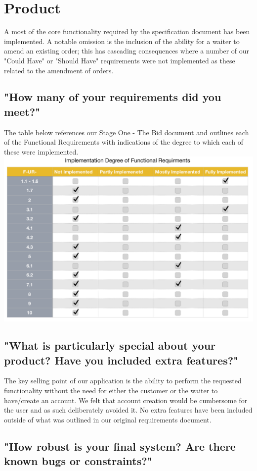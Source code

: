 \documentclass[11pt, oneside, a4paper]{report}   %
\begin{document}
\section{Product} 
A most of the core functionality required by the specification document has been implemented. A notable omission is the inclusion of the ability for a waiter to amend an existing order; this has cascading consequences where a number of our "Could Have" or "Should Have" requirements were not implemented as these related to the amendment of orders. 
\subsection{"How many of your requirements did you meet?"}
The table below references our Stage One - The Bid document and outlines each of the Functional Requirements with indications of the degree to which each of these were implemented.\\
\includegraphics[width = \textwidth]{FR.png}
\subsection{"What is particularly special about your product? Have you included extra features?"}
The key selling point of our application is the ability to perform the requested functionality without the need for either the customer or the waiter to have/create an account. We felt that account creation would be cumbersome for the user and as such deliberately avoided it. No extra features have been included outside of what was outlined in our original requirements document. 
\subsection{"How robust is your final system? Are there known bugs or constraints?"}
\end{document}
